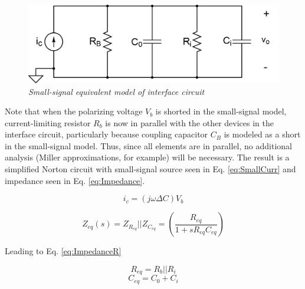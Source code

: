 \documentclass[journal]{IEEEtran}
\begin{document}
\begin{figure}[ht]
	\centering
	\includegraphics[scale=0.2]{smallSig.png}
	\caption{\em Small-signal equivalent model of interface circuit}
	\label{fig:SmallSig}
\end{figure}

Note that when the polarizing voltage $V_b$ is shorted in the small-signal model, current-limiting resistor $R_b$ is now in parallel with the other devices in the interface circuit, particularly because coupling capacitor $C_B$ is modeled as a short in the small-signal model. Thus, since all elements are in parallel, no additional analysis (Miller approximations, for example) will be necessary. The result is a simplified Norton circuit with small-signal source seen in Eq. \ref{eq:SmallCurr} and impedance seen in Eq. \ref{eq:Impedance}.

\begin{figure}[ht]

	\begin{equation}
		i_c = (j \omega \Delta C) V_b
		\label{eq:SmallCurr}
	\end{equation}

	\begin{equation}
		Z_{eq}(s) = Z_{R_{eq}} || Z_{C_{eq}} = \left(\frac{R_{eq}}{1 + sR_{eq}C_{eq}}\right)
		\label{eq:Impedance}
	\end{equation}

\end{figure}

Leading to Eq. \ref{eq:ImpedanceR}

\begin{figure}[ht]

	\begin{equation}
		R_{eq} = R_b || R_i
		\label{eq:ImpedanceR}
	\end{equation}
	\begin{equation}
		C_{eq} = C_0 + C_i
		\label{eq:ImpedanceC}
	\end{equation}

\end{figure}
\end{document}
